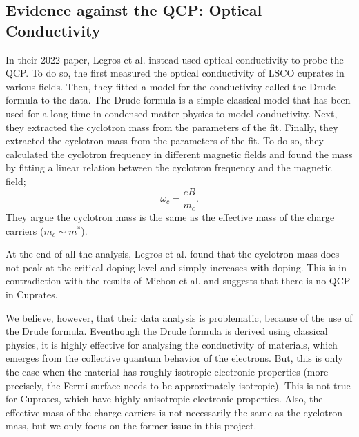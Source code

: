 \subsection{Evidence against the QCP: Optical Conductivity}
In their 2022 paper, Legros et al. \cite{legros2022} instead used optical conductivity to
probe the QCP. To do so, the first measured the optical conductivity of LSCO cuprates in various
fields. Then, they fitted a model for the conductivity called the Drude formula to the data. The
Drude formula is a simple classical model that has been used for a long time in condensed matter
physics to model conductivity. Next, they extracted the cyclotron mass from the parameters of the
fit. Finally, they extracted the cyclotron mass from the parameters of the fit. To do so, they
calculated the cyclotron frequency in different magnetic fields and found the mass by fitting a
linear relation between the cyclotron frequency and the magnetic field;
\begin{equation}
    \omega_c = \frac{eB}{m_c}.
\end{equation}
They argue the cyclotron mass is the same as the effective mass of the charge carriers
($m_c \sim m^*$).

At the end of all the analysis, Legros et al. found that the cyclotron mass does not peak
at the critical doping level and simply increases with doping. This is in contradiction with the
results of Michon et al. and suggests that there is no QCP in Cuprates.

We believe, however, that their data analysis is problematic, because of the use of the Drude
formula. Eventhough the Drude formula is derived using classical physics, it is highly effective for
analysing the conductivity of materials, which emerges from the collective quantum behavior of the
electrons. But, this is only the case when the material has roughly isotropic electronic properties
(more precisely, the Fermi surface needs to be approximately isotropic). This is not true for
Cuprates, which have highly anisotropic electronic properties. Also, the effective mass of the
charge carriers is not necessarily the same as the cyclotron mass, but we only focus on the former
issue in this project.
